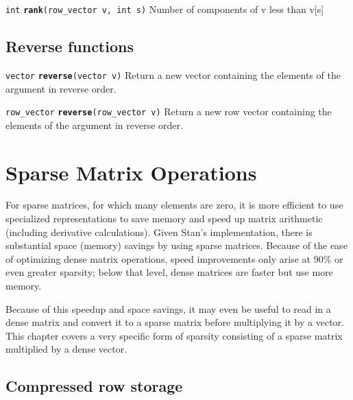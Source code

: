 \documentclass[
  10pt,
]{book}
\begin{document}

\texttt{int} \textbf{\texttt{rank}}\texttt{(row\_vector\ v,\ int\ s)}\newline
Number of components of v less than v{[}s{]}

\hypertarget{reverse-functions}{%
\section{Reverse functions}\label{reverse-functions}}


\texttt{vector} \textbf{\texttt{reverse}}\texttt{(vector\ v)}\newline
Return a new vector containing the elements of the argument in reverse order.


\texttt{row\_vector} \textbf{\texttt{reverse}}\texttt{(row\_vector\ v)}\newline
Return a new row vector containing the elements of the argument in reverse order.

\hypertarget{sparse-matrices}{%
\chapter{Sparse Matrix Operations}\label{sparse-matrices}}

For sparse matrices, for which many elements are zero, it is more
efficient to use specialized representations to save memory and speed
up matrix arithmetic (including derivative calculations). Given
Stan's implementation, there is substantial space (memory) savings by
using sparse matrices. Because of the ease of optimizing dense matrix
operations, speed improvements only arise at 90\% or even greater
sparsity; below that level, dense matrices are faster but use more
memory.

Because of this speedup and space savings, it may even be useful to
read in a dense matrix and convert it to a sparse matrix before
multiplying it by a vector. This chapter covers a very specific form
of sparsity consisting of a sparse matrix multiplied by a dense
vector.

\hypertarget{CSR}{%
\section{Compressed row storage}\label{CSR}}
\end{document}
